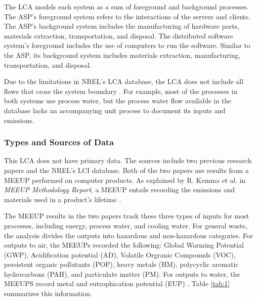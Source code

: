 \documentclass[final,journal,10pt,letterpaper,oneside,twocolumn,compsoc]%
{IEEEtran}
\begin{document}
The LCA models each system as a sum of foreground and background processes. The
ASP's foreground system refers to the interactions of the servers and
clients. The ASP's background system includes the manufacturing
of hardware parts, materials
extraction, transportation, and disposal. The distributed software system's
foreground
includes the use of computers to run the software. Similar to the ASP, its
background
system includes materials extraction, manufacturing, transportation, and
disposal.

Due to the limitations in NREL's LCA database, the LCA does not include all
flows that cross the system boundary \cite{database}. For example, most of the
processes in
both systems use process water, but the process water flow available in the
database lacks an accompanying unit process to document its inputs and
emissions.

\subsubsection{Types and Sources of Data}
This LCA does not have primary data. The sources include two previous research
papers
and the NREL's LCI database. Both of the two papers use results from a
MEEUP performed on
computer products. As explained by R. Kemma et al. in \textit{MEEUP Methodology
Report}, a MEEUP entails recording the emissions and materials used
in a product's lifetime \cite{meeup}.

The MEEUP results in the two papers track these
three types of inputs for most processes, including energy, process
water, and cooling water. For general waste, the analysis divides the outputs
into hazardous and non-hazardous categories. For outputs to air, the MEEUPs
recorded the following: Global Warming Potential (GWP), Acidification
potential (AD), Volatile Orgranic Compounds (VOC), persistent organic
pollutants (POP), heavy
metals (HM), polycyclic aromatic hydrocarbons (PAH), and particulate matter
(PM). For outputs to
water, the MEEUPS record metal and eutrophication potential (EUP) \cite{client}
\cite{desktop}. Table \ref{tab:1} summarizes this information.
\end{document}
